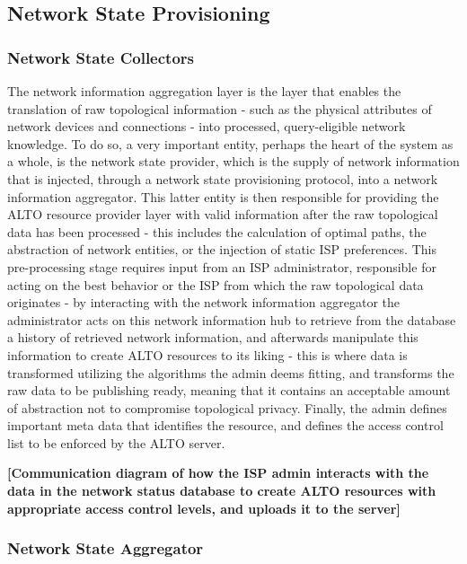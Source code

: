 \subsection{Network State Provisioning}

\subsubsection{Network State Collectors}

    The network information aggregation layer is the layer that enables the translation of raw topological information - such as the physical attributes of network devices and connections - into processed, query-eligible network knowledge.
    To do so, a very important entity, perhaps the heart of the system as a whole, is the network state provider, which is the supply of network information that is injected, through a network state provisioning protocol, into a network information aggregator.
    This latter entity is then responsible for providing the ALTO resource provider layer with valid information after the raw topological data has been processed - this includes the calculation of optimal paths, the abstraction of network entities, or the injection of static ISP preferences.
    This pre-processing stage requires input from an ISP administrator, responsible for acting on the best behavior or the ISP from which the raw topological data originates - by interacting with the network information aggregator the administrator acts on this network information hub to retrieve from the database a history of retrieved network information, and afterwards manipulate this information to create ALTO resources to its liking - this is where data is transformed utilizing the algorithms the admin deems fitting, and transforms the raw data to be publishing ready, meaning that it contains an acceptable amount of abstraction not to compromise topological privacy.
    Finally, the admin defines important meta data that identifies the resource, and defines the access control list to be enforced by the ALTO server.

    \textbf{[Communication diagram of how the ISP admin interacts with the data in the network status database to create ALTO resources with appropriate access control levels, and uploads it to the server]}

\subsubsection{Network State Aggregator}


